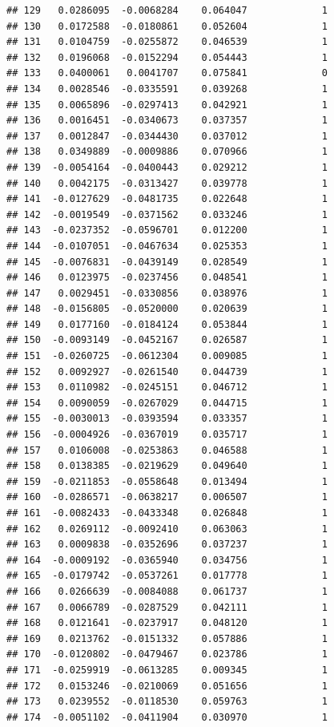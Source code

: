 \documentclass[12pt]{article}\usepackage[]{graphicx}\usepackage[]{xcolor}
\makeatletter
\newenvironment{kframe}{%
 \def\at@end@of@kframe{}%
 \ifinner\ifhmode%
  \def\at@end@of@kframe{\end{minipage}}%
  \begin{minipage}{\columnwidth}%
 \fi\fi%
 \def\FrameCommand##1{\hskip\@totalleftmargin \hskip-\fboxsep
 \colorbox{shadecolor}{##1}\hskip-\fboxsep
     \hskip-\linewidth \hskip-\@totalleftmargin \hskip\columnwidth}%
 \MakeFramed {\advance\hsize-\width
   \@totalleftmargin\z@ \linewidth\hsize
   \@setminipage}}%
 {\par\unskip\endMakeFramed%
 \at@end@of@kframe}
\newenvironment{knitrout}{}{} %
\makeatother
\begin{document}
\begin{knitrout}
\begin{kframe}
\begin{verbatim}
## 129   0.0286095  -0.0068284    0.064047             1
## 130   0.0172588  -0.0180861    0.052604             1
## 131   0.0104759  -0.0255872    0.046539             1
## 132   0.0196068  -0.0152294    0.054443             1
## 133   0.0400061   0.0041707    0.075841             0
## 134   0.0028546  -0.0335591    0.039268             1
## 135   0.0065896  -0.0297413    0.042921             1
## 136   0.0016451  -0.0340673    0.037357             1
## 137   0.0012847  -0.0344430    0.037012             1
## 138   0.0349889  -0.0009886    0.070966             1
## 139  -0.0054164  -0.0400443    0.029212             1
## 140   0.0042175  -0.0313427    0.039778             1
## 141  -0.0127629  -0.0481735    0.022648             1
## 142  -0.0019549  -0.0371562    0.033246             1
## 143  -0.0237352  -0.0596701    0.012200             1
## 144  -0.0107051  -0.0467634    0.025353             1
## 145  -0.0076831  -0.0439149    0.028549             1
## 146   0.0123975  -0.0237456    0.048541             1
## 147   0.0029451  -0.0330856    0.038976             1
## 148  -0.0156805  -0.0520000    0.020639             1
## 149   0.0177160  -0.0184124    0.053844             1
## 150  -0.0093149  -0.0452167    0.026587             1
## 151  -0.0260725  -0.0612304    0.009085             1
## 152   0.0092927  -0.0261540    0.044739             1
## 153   0.0110982  -0.0245151    0.046712             1
## 154   0.0090059  -0.0267029    0.044715             1
## 155  -0.0030013  -0.0393594    0.033357             1
## 156  -0.0004926  -0.0367019    0.035717             1
## 157   0.0106008  -0.0253863    0.046588             1
## 158   0.0138385  -0.0219629    0.049640             1
## 159  -0.0211853  -0.0558648    0.013494             1
## 160  -0.0286571  -0.0638217    0.006507             1
## 161  -0.0082433  -0.0433348    0.026848             1
## 162   0.0269112  -0.0092410    0.063063             1
## 163   0.0009838  -0.0352696    0.037237             1
## 164  -0.0009192  -0.0365940    0.034756             1
## 165  -0.0179742  -0.0537261    0.017778             1
## 166   0.0266639  -0.0084088    0.061737             1
## 167   0.0066789  -0.0287529    0.042111             1
## 168   0.0121641  -0.0237917    0.048120             1
## 169   0.0213762  -0.0151332    0.057886             1
## 170  -0.0120802  -0.0479467    0.023786             1
## 171  -0.0259919  -0.0613285    0.009345             1
## 172   0.0153246  -0.0210069    0.051656             1
## 173   0.0239552  -0.0118530    0.059763             1
## 174  -0.0051102  -0.0411904    0.030970             1

\end{verbatim}
\end{kframe}
\end{knitrout}
\end{document}
